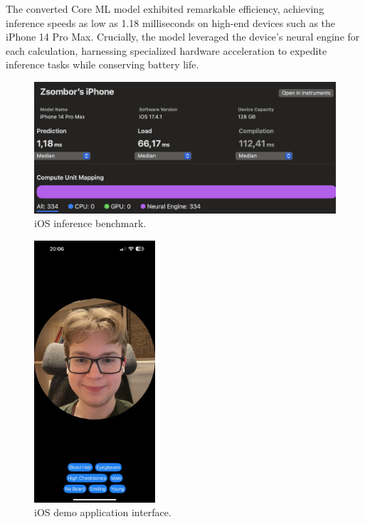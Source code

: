 \documentclass[a4paper,oneside]{article}
\begin{document}
The converted Core ML model exhibited remarkable efficiency, achieving inference speeds as low as 1.18 milliseconds on high-end devices such as the iPhone 14 Pro Max.
Crucially, the model leveraged the device's neural engine for each calculation, harnessing specialized hardware acceleration to expedite inference tasks while conserving battery life.

\begin{figure}[h]
  \includegraphics[width=\textwidth]{iOSInference.png}
  \centering
  \caption{iOS inference benchmark.}
  \centering
\end{figure}

\begin{figure}
  \includegraphics[width=0.4\textwidth]{iOSapp.jpeg}
  \centering
  \caption{iOS demo application interface.}
  \centering
\end{figure}
\end{document}

